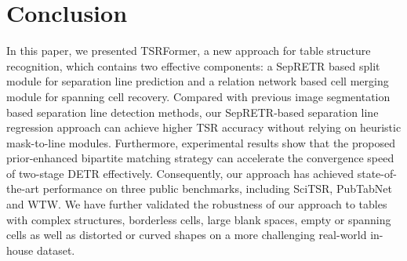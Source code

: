 \documentclass[sigconf]{acmart}
\begin{document}
\section{Conclusion}
In this paper, we presented TSRFormer, a new approach for table structure recognition, which contains two effective components: a SepRETR based split module for separation line prediction and a relation network based cell merging module for spanning cell recovery. Compared with previous image segmentation based separation line detection methods, our SepRETR-based separation line regression approach can achieve higher TSR accuracy without relying on heuristic mask-to-line modules. Furthermore, experimental results show that the proposed prior-enhanced bipartite matching strategy can accelerate the convergence speed of two-stage DETR effectively. Consequently, our approach has achieved state-of-the-art performance on three public benchmarks, including SciTSR, PubTabNet and WTW. We have further validated the robustness of our approach to tables with complex structures, borderless cells, large blank spaces, empty or spanning cells as well as distorted or curved shapes on a more challenging real-world in-house dataset.

\clearpage


\end{document}
